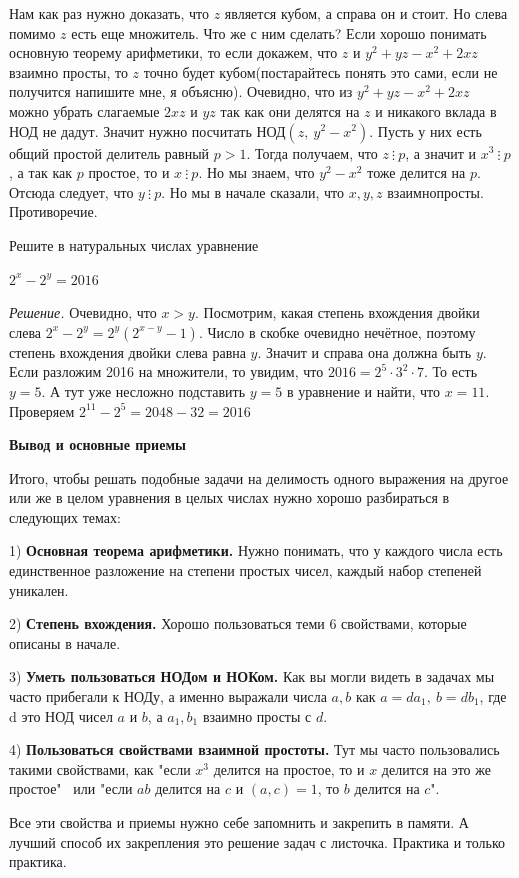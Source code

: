Нам как раз нужно доказать, что $z$ является кубом, а справа он и стоит. Но слева помимо $z$ есть еще множитель. Что же с ним сделать? Если хорошо понимать основную теорему арифметики, то если докажем, что $z$ и $y^2 + yz - x^2 + 2xz$ взаимно просты, то $z$ точно будет кубом(постарайтесь понять это сами, если не получится напишите мне, я объясню). Очевидно, что из $y^2 + yz - x^2 + 2xz$ можно убрать слагаемые $2xz$ и $yz$ так как они делятся на $z$ и никакого вклада в НОД не дадут. Значит нужно посчитать НОД$(z, \ y^2 - x^2)$. Пусть у них есть общий простой делитель равный $p>1$. Тогда получаем, что $z \ \vdots \ p$, а значит и $x^3 \ \vdots \ p$, а так как $p$ простое, то и $x \ \vdots \ p$. Но мы знаем, что $y^2 - x^2$ тоже делится на $p$. Отсюда следует, что $y \ \vdots \ p$. Но мы в начале сказали, что $x, y, z$ взаимнопросты. Противоречие. 

\hspace{3mm}

 Решите в натуральных числах уравнение

\centerline{$2^x - 2^y = 2016$}

\hspace{3mm}

\textit{Решение.} Очевидно, что $x>y$. Посмотрим, какая степень вхождения двойки слева $2^x - 2^y = 2^y(2^{x-y} - 1)$. Число в скобке очевидно нечётное, поэтому степень вхождения двойки слева равна $y$. Значит и справа она должна быть $y$. Если разложим 2016 на множители, то увидим, что $2016 = 2^5\cdot3^2\cdot7$. То есть $y=5$. А тут уже несложно подставить $y=5$ в уравнение и найти, что $x=11$. Проверяем $2^{11} - 2^5 = 2048 - 32 = 2016$


\hspace{3mm}

\textbf{\Large Вывод и основные приемы}

\hspace{3mm}

Итого, чтобы решать подобные задачи на делимость одного выражения на другое или же в целом уравнения в целых числах нужно хорошо разбираться в следующих темах:

1) \textbf{Основная теорема арифметики.} Нужно понимать, что у каждого числа есть единственное разложение на степени простых чисел, каждый набор степеней уникален.

2) \textbf{Степень вхождения.} Хорошо пользоваться теми 6 свойствами, которые описаны в начале.

3) \textbf{Уметь пользоваться НОДом и НОКом.} Как вы могли видеть в задачах мы часто прибегали к НОДу, а именно выражали числа $a, b$ как $a = da_1, \ b = db_1$, где d это НОД чисел $a$ и $b$, а $a_1, b_1$ взаимно просты с $d$.

4) \textbf{Пользоваться свойствами взаимной простоты.} Тут мы часто пользовались такими свойствами, как "если $x^3$ делится на простое, то и $x$ делится на это же простое" \ или "если $ab$ делится на $c$ и $(a, c) = 1 $, то $b$ делится на $c$". 

Все эти свойства и приемы нужно себе запомнить и закрепить в памяти. А лучший способ их закрепления это решение задач с листочка. Практика и только практика.